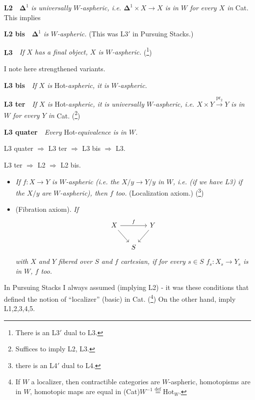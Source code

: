 \documentclass[11pt]{article}
\newcommand{\printedpage}[1]{\marginpar{\footnotesize p.~#1}}
\newcommand{\msp}[1]{\marginpar{\footnotesize [#1]}}
\newcommand{\deq}{\overset{\text{def}}{=}}
\begin{document}
\noindent\textbf{L2}\ \ $\mathbf{\Delta}^1$ \textit{is universally $W$-aspheric, i.e. $\mathbf{\Delta}^1 \times X \longrightarrow X$ is in $W$ for every $X$ in} Cat. This implies

\noindent\textbf{L2 bis}\ \ $\mathbf{\Delta}^1$ \textit{is $W$-aspheric.} (This was L3$'$ in Pursuing Stacks.)

\noindent\textbf{L3}\ \ \textit{If $X$ has a final object, $X$ is $W$-aspheric.} (\footnote[1]{There is an L3$'$ dual to L3.})

\noindent I note here strengthened variants.

\noindent\textbf{L3 bis}\ \ \textit{If $X$ is} Hot-\textit{aspheric, it is $W$-aspheric.}

\noindent\textbf{L3 ter}\ \ \textit{If $X$ is} Hot-\textit{aspheric, it is universally $W$-aspheric, i.e. $X \times Y \xrightarrow{\mathrm{pr}_2} Y$ is in $W$ for every $Y$ in} Cat. (\footnote[2]{Suffices to imply L2, L3.})

\clearpage

\noindent\printedpage{2}
\textbf{L3 quater}\ \ \textit{Every} Hot-\textit{equivalence is in $W$.}

\noindent L3 quater $\Longrightarrow$ L3 ter $\Longrightarrow$ L3 bis $\Longrightarrow$ L3.

\noindent L3 ter $\Longrightarrow$ L2 $\Longrightarrow$ L2 bis.

\noindent\msp{page 2}

\begin{itemize}[leftmargin=2.5em]
\item[\textbf{L4}] \textit{If $f : X \longrightarrow Y$ is $W$-aspheric (i.e. the $X/y \longrightarrow Y/y$ in $W$, i.e. (if we have L3) if the $X/y$ are $W$-aspheric), then $f$ too.} (Localization axiom.) (\footnote[3]{there is an L4$'$ dual to L4.})

\item[\textbf{L5}] (Fibration axiom). \textit{If}
\[
\begin{tikzcd}[column sep=small]
X \arrow[rr, "f"] \arrow[dr] & & Y \arrow[dl] \\
& S &
\end{tikzcd}
\]
\textit{with $X$ and $Y$ fibered over $S$ and $f$ cartesian, if for every $s \in S$ $f_s : X_s \longrightarrow Y_s$ is in $W$, $f$ too.}
\end{itemize}

\noindent In Pursuing Stacks I always assumed  (implying L2) - it was these conditions that defined the notion of ``localizer'' (basic) in Cat. (\footnote[4]{If $W$ a localizer, then contractible categories are $W$-aspheric, homotopisms are in $W$, homotopic maps are equal in (Cat)$W^{-1} \deq \mathrm{Hot}_W$.}) On the other hand,  imply L1,2,3,4,5.
\end{document}
